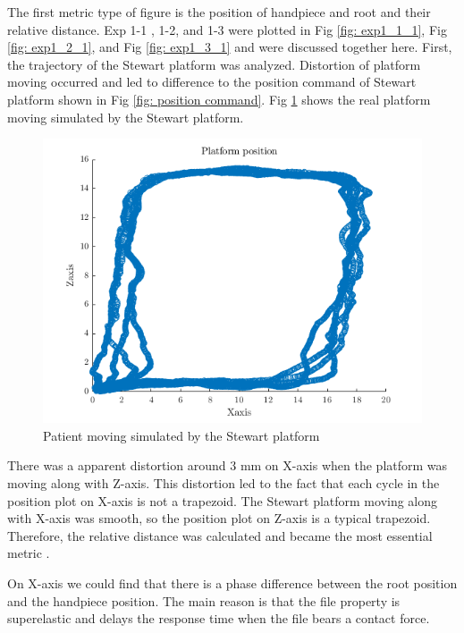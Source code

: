 \par
The first metric type of figure is the position of handpiece and root and their relative distance. Exp 1-1 , 1-2, and 1-3 were plotted in Fig \ref{fig: exp1_1_1}, Fig \ref{fig: exp1_2_1}, and Fig \ref{fig: exp1_3_1} and were discussed together here. First, the trajectory of the Stewart platform was analyzed. Distortion of platform moving occurred and led to difference to the position command of Stewart platform shown in Fig \ref{fig:  position command}. Fig \ref{fig: distortion} shows the real platform moving simulated by the Stewart platform.
\begin{figure}[htbp]
\begin{center}
\includegraphics[width=0.8\linewidth]{Images/exp/platform moving.png}
\caption{Patient moving simulated by the Stewart platform }
\label{fig: distortion}
\end{center}
\end{figure}	
\par
There was a apparent distortion around $3$ mm on X-axis when the platform was moving along with Z-axis. This distortion led to the fact that each cycle in the position plot on X-axis is not a trapezoid. The Stewart platform moving along with X-axis was smooth, so the position plot on Z-axis is a typical trapezoid. Therefore, the relative distance was calculated and became the most essential metric . 
\par
On X-axis we could find that there is a phase difference between the root position and the handpiece position. The main reason is that the file property is superelastic and delays the response time when the file bears a contact force. 
\par
